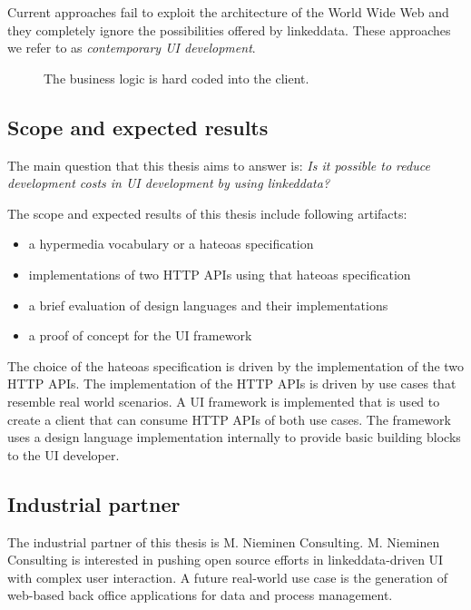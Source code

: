Current approaches fail to exploit the architecture of the World Wide Web and they completely ignore the possibilities offered by \gls{linkeddata}. These approaches we refer to as \textit{contemporary UI development}.

\begin{figure}[!htb]
  \caption{The business logic is hard coded into the client.}
  \label{fig:hardcoded}
\end{figure}

\subsection{Scope and expected results}\label{sec:scope}
The main question that this thesis aims to answer is: \textit{Is it possible to reduce development costs in UI development by using \gls{linkeddata}?}

The scope and expected results of this thesis include following artifacts:

\begin{itemize}
\item a \gls{hypermedia} vocabulary or a \gls{hateoas} specification
\item implementations of two HTTP APIs using that \gls{hateoas} specification
\item a brief evaluation of design languages and their implementations
\item a proof of concept for the UI framework
\end{itemize}

The choice of the \gls{hateoas} specification is driven by the implementation of the two HTTP APIs. The implementation of the HTTP APIs is driven by use cases that resemble real world scenarios. A UI framework is implemented that is used to create a client that can consume HTTP APIs of both use cases. The framework uses a design language implementation internally to provide basic building blocks to the UI developer.

\subsection{Industrial partner}
The industrial partner of this thesis is M. Nieminen Consulting. M. Nieminen Consulting is interested in pushing open source efforts in \gls{linkeddata}-driven UI with complex user interaction. A future real-world use case is the generation of web-based back office applications for data and process management.
